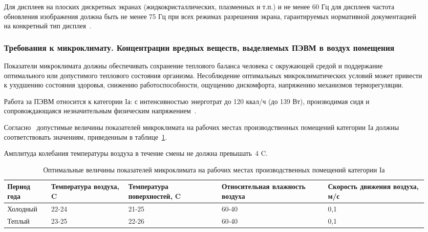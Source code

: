 Для дисплеев на плоских дискретных экранах (жидкокристаллических, плазменных и т.п.) и не менее 60 Гц 
для дисплеев частота обновления изображения должна быть не менее 75 Гц при всех режимах 
разрешения экрана, гарантируемых нормативной документацией на конкретный тип дисплея~\cite{sanpin_2.4.1340-03}.


\subsubsection{Требования к микроклимату. Концентрации вредных веществ, выделяемых ПЭВМ в воздух помещения}


 Показатели микроклимата должны обеспечивать сохранение теплового баланса человека с окружающей средой и 
 поддержание оптимального или допустимого теплового состояния организма.
 Несоблюдение оптимальных микроклиматических условий может привести к ухудшению состояния здоровья,
 снижению работоспособности, ощущению дискомфорта, напряжению механизмов терморегуляции.
 
 Работа за ПЭВМ относится к категории Iа: с интенсивностью энерготрат до 120 ккал/ч (до 139 Вт), 
 производимая сидя и сопровождающаяся незначительным физическим напряжением~\cite{sanpin_mikroclimate}.
 
 Согласно~\cite{sanpin_mikroclimate} допустимые величины показателей микроклимата на рабочих местах производственных помещений категории Iа 
 должны соответствовать значениям, приведенным в таблице~\ref{tab:climate_1}. 
 
 Амплитуда колебания температуры воздуха в течение смены не должна превышать~4\textdegree{} C.
 
\begin{table}[h!]
\caption{ Оптимальные величины показателей микроклимата на рабочих местах производственных помещений категории Iа }
\label{tab:climate_1}
\begin{center}
\begin{tabularx}{\linewidth}{|X|X|X|X|X|}
\hline
Период года & Температура воздуха, \textdegree{}C & Температура поверхностей, \textdegree{}C & Относительная влажность воздуха & Скорость движения воздуха, м/с\\
\hline
Холодный & 22-24 & 21-25 & 60-40 & 0,1\\
\hline
Теплый & 23-25 & 22-26 & 60-40 & 0,1\\
\hline
\end{tabularx}
\end{center}
\end{table}


